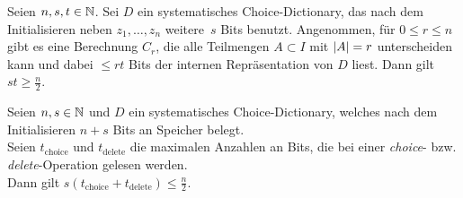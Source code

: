 \documentclass{cheat-sheet}
\begin{document}
\begin{thm}
  Seien $n, s, t \in \mathbb{N}$.
  Sei $D$ ein systematisches Choice-Dictionary, das nach dem Initialisieren neben $z_1, \ldots, z_n$ weitere~$s$ Bits benutzt.
  Angenommen, für $0 \leq r \leq n$ gibt es eine Berechnung $C_r$, die alle Teilmengen $A \subset I$ mit $\lvert A\rvert = r$ unterscheiden kann und dabei $\leq rt$ Bits der internen Repräsentation von $D$ liest.
  Dann gilt $st \geq \tfrac{n}{2}$.
\end{thm}

\begin{kor}
  Seien $n, s \in \mathbb{N}$ und $D$ ein systematisches Choice-Dictionary, welches nach dem Initialisieren $n + s$ Bits an Speicher belegt. \\
  Seien $t_{\text{choice}}$ und $t_{\text{delete}}$ die maximalen Anzahlen an Bits, die bei einer \textit{choice}- bzw. \textit{delete}-Operation gelesen werden. \\
  Dann gilt $s (t_{\text{choice}} + t_{\text{delete}}) \leq \tfrac{n}{2}$.
\end{kor}
\end{document}
